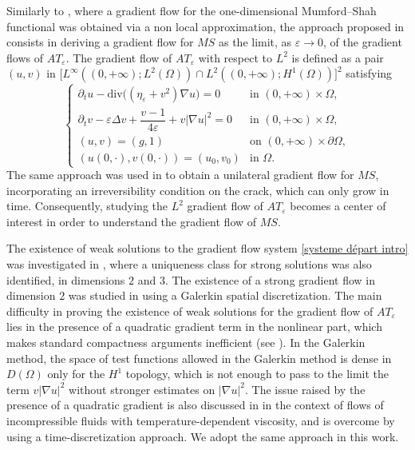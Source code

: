 \documentclass[reqno,12pt,twoside]{amsart}
\numberwithin{equation}{section} \numberwithin{theorem}{section}
\numberwithin{proposition}{section} \numberwithin{lemma}{section}
\numberwithin{corollary}{section}
\numberwithin{definition}{section} \numberwithin{remark}{section}
\begin{document}
Similarly to \cite{G98}, where a gradient flow for the one-dimensional Mumford--Shah functional was obtained via a non local approximation, the approach proposed in \cite{FP04} consists in deriving a gradient flow for $MS$ as the limit, as $\varepsilon \to 0$, of the gradient flows of $AT_\varepsilon$. The gradient flow of $AT_\varepsilon$ with respect to $L^2$ is defined as a pair $(u,v)$ in $\big[L^\infty((0,+\infty); L^2(\Omega)) \cap L^2((0,+\infty); H^1(\Omega))\big]^2$
satisfying
\begin{equation}\label{systeme départ intro}
\left\{
\begin{array}{ll}
\partial_t u - \mathrm{div}\big((\eta_\varepsilon + v^2) \nabla u\big) = 0 & \text{in } (0,+\infty) \times \Omega,\\
\partial_t v - \varepsilon \Delta v + \dfrac{v-1}{4\varepsilon} + v |\nabla u|^2 = 0 & \text{in } (0,+\infty) \times \Omega,\\
(u,v) = (g,1) & \text{on } (0,+\infty) \times \partial\Omega,\\
(u(0,\cdot), v(0,\cdot)) = (u_0, v_0) & \text{in } \Omega.
\end{array}
\right.
\end{equation}
The same approach was used in \cite{BM14} to obtain a unilateral gradient flow for $MS$, incorporating an irreversibility condition on the crack, which can only grow in time. 
Consequently, studying the $L^2$ gradient flow of $AT_\varepsilon$ becomes a center of interest in order to understand the gradient flow of $MS$.

\smallskip

The existence of weak solutions to the gradient flow system \eqref{systeme départ intro} was investigated in \cite{FP04}, where a uniqueness class for strong solutions was also identified, in dimensions $2$ and $3$. The existence of a strong gradient flow in dimension $2$ was studied in \cite{Cortopassi_2024} using a Galerkin spatial discretization. 
The main difficulty in proving the existence of weak solutions for the gradient flow of $AT_\varepsilon$ lies in the presence of a quadratic gradient term in the nonlinear part, which makes standard compactness arguments inefficient (see \cite{E90}). In the Galerkin method, the space of test functions allowed in the Galerkin method is dense in $D(\Omega)$ only for the $H^1$ topology, which is not enough to pass to the limit the term $v|\nabla u|^2$ without stronger estimates on $|\nabla u|^2$. The issue raised by the presence of a quadratic gradient is also discussed in \cite{X94} in the context of flows of incompressible fluids with temperature-dependent viscosity, and is overcome by using a time-discretization approach. We adopt the same approach in this work.  
\end{document}

